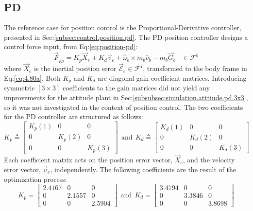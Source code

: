 \subsection{PD}
\label{subsec:simulation.position.pd}
The reference case for position control is the Proportional-Derivative controller, presented in Sec:\ref{subsec:control.position.pd}. The PD position controller designs a control force input, from Eq:\ref{eq:position-pd}:
\begin{equation}\label{eq:optimized-position}
\vec{F}_{_{PD}}=K_p\vec{X}_e + K_d\vec{v}_e + \hat{\omega}_b\times m_b\hat{v}_b-m_b\vec{G}_b~~~~\in\mathcal{F}^{b}
\end{equation}
where $\vec{X}_e$ is the inertial position error $\vec{\mathcal{E}}_e\in\mathcal{F}^{I}$, transformed to the body frame in Eq:\ref{eq:4.80a}. Both $K_p$ and $K_d$ are diagonal gain coefficient matrices. Introducing symmetric $[3\times 3]$ coefficients to the gain matrices did not yield any improvements for the attitude plant in Sec:\ref{subsubsec:simulation.atttiude.pd.3x3}, so it was not investigated in the context of position control. The two coefficients for the PD controller are structured as follows:
\begin{equation}\label{eq:simulation-attitde-pd-diagonal-coefficients}
K_p\triangleq \begin{bmatrix}
K_p(1) & 0 & 0\\
0 & K_p(2) & 0\\
0 & 0 & K_p(3)
\end{bmatrix}
~~\text{and}~~K_d\triangleq \begin{bmatrix}
K_d(1) & 0 & 0\\
0 & K_d(2) & 0\\
0 & 0 & K_d(3)
\end{bmatrix}
\end{equation}
Each coefficient matrix acts on the position error vector, $\vec{X}_e$, and the velocity error vector, $\vec{v}_e$, independently. The following coefficients are the result of the optimization process:
\begin{equation}\label{eq:optimized-position-pd}
K_p = \begin{bmatrix}
2.4167 & 0 & 0\\
0 & 2.1557 & 0\\
0 & 0 & 2.5904
\end{bmatrix}
~~\text{and}~~K_d = \begin{bmatrix}
3.4794 & 0 & 0\\
0 & 3.3846 & 0\\
0 & 0 & 3.8698
\end{bmatrix}
\end{equation}
